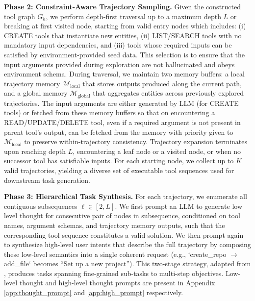 \documentclass{article}
\theoremstyle{plain}
\theoremstyle{definition}
\theoremstyle{remark}
\begin{document}
\textbf{Phase 2: Constraint-Aware Trajectory Sampling.}
Given the constructed tool graph $G_h$, we perform depth-first traversal up to a maximum depth $L$  or breaking at first visited node, starting from valid entry nodes which includes: (i) \textsc{CREATE} tools that instantiate new entities, (ii) \textsc{LIST/SEARCH} tools with no mandatory input dependencies, and (iii) tools whose required inputs can be satisfied by environment-provided seed data. This selection is to ensure that the input arguments provided during exploration are not hallucinated and obeys environment schema.
During traversal, we maintain two memory buffers: a local trajectory memory $\mathcal{M}_{\text{local}}$ that stores outputs produced along the current path, and a global memory $\mathcal{M}_{\text{global}}$ that aggregates entities across previously explored trajectories. The input arguments are either generated by LLM (for CREATE tools) or fetched from these memory buffers so that on encountering a \textsc{READ/UPDATE/DELETE} tool, even if a required argument is not present in parent tool's output, can be fetched from the memory with priority given to $\mathcal{M}_{\text{local}}$ to preserve within-trajectory consistency.
Trajectory expansion terminates upon reaching depth $L$, encountering a leaf node or a visited node, or when no successor tool has satisfiable inputs. For each starting node, we collect up to $K$ valid trajectories, yielding a diverse set of executable tool sequences used for downstream task generation.

\textbf{Phase 3: Hierarchical Task Synthesis.}
For each trajectory, we enumerate all contiguous subsequences $\ell \in [2, L]$. We first prompt an LLM to generate low level thought for consecutive pair of nodes in subsequence, conditioned on tool names, argument schemas, and trajectory memory outputs, such that the corresponding tool sequence constitutes a valid solution. We then prompt again to synthesize high-level user intents that describe the full trajectory by composing these low-level semantics into a single coherent request (e.g., `create\_repo $\rightarrow$ add\_file` becomes ``Set up a new project''). 
This two-stage strategy, adapted from \citet{sun2025genesis}, produces tasks spanning fine-grained sub-tasks to multi-step objectives. Low-level thought and high-level thought prompts are present in Appendix \ref{app:thought_prompt} and \ref{app:high_prompt} respectively.
\end{document}
